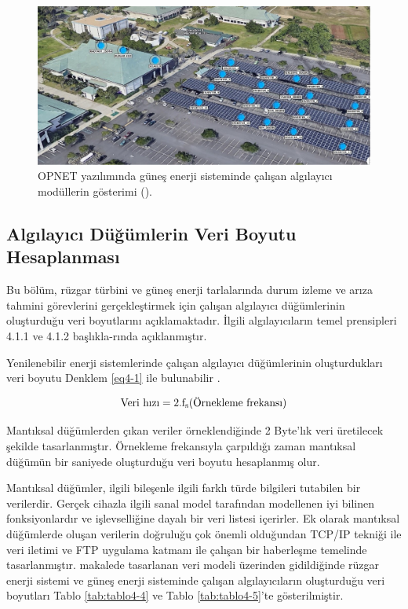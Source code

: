 \begin{figure}[htbp]
\centerline{\includegraphics[width=\columnwidth]{Resim/sekil4-3.jpg}}
\caption{OPNET yazılımında güneş enerji sisteminde çalışan algılayıcı modüllerin gösterimi (\protect{}).}
\label{fig:4-3}
\end{figure}


\subsection{Algılayıcı Düğümlerin Veri Boyutu Hesaplanması}\label{verboyut}

Bu bölüm, rüzgar türbini ve güneş enerji tarlalarında durum izleme ve arıza tahmini görevlerini gerçekleştirmek için çalışan algılayıcı düğümlerinin oluşturduğu veri boyutlarını açıklamaktadır. İlgili algılayıcıların temel prensipleri 4.1.1 ve 4.1.2 başlıkla-rında açıklanmıştır.


Yenilenebilir enerji sistemlerinde çalışan algılayıcı düğümlerinin oluşturdukları veri boyutu Denklem \eqref{eq4-1} ile bulunabilir \cite{ahmed2011simulation}.


\begin{equation}
\text{Veri hızı} = 2.\text{f\textsubscript{s}}(\text{Örnekleme frekansı}) \label{eq4-1}
\end{equation}

Mantıksal düğümlerden çıkan veriler örneklendiğinde 2 Byte’lık veri üretilecek şekilde tasarlanmıştır. Örnekleme frekansıyla çarpıldığı zaman mantıksal düğümün bir saniyede oluşturduğu veri boyutu hesaplanmış olur.

Mantıksal düğümler, ilgili bileşenle ilgili farklı türde bilgileri tutabilen bir verilerdir. Gerçek cihazla ilgili sanal model tarafından modellenen iyi bilinen fonksiyonlardır ve işlevselliğine dayalı bir veri listesi içerirler. Ek olarak mantıksal düğümlerde oluşan verilerin doğruluğu çok önemli olduğundan TCP/IP tekniği ile veri iletimi ve FTP uygulama katmanı ile çalışan bir haberleşme temelinde tasarlanmıştır. \cite{klise2017application} makalede tasarlanan veri modeli üzerinden gidildiğinde rüzgar enerji sistemi ve güneş enerji sisteminde çalışan algılayıcıların oluşturduğu veri boyutları Tablo \ref{tab:tablo4-4} ve Tablo \ref{tab:tablo4-5}’te gösterilmiştir.

